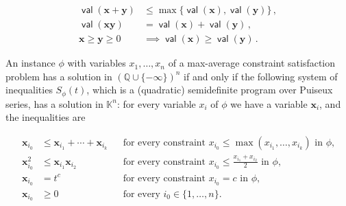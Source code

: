 \begin{equation}\tag{2}\label{S4.E2}
\begin{aligned}
\displaystyle\operatorname*{\mathsf{val}}(\bm{x}+\bm{y}) & \displaystyle\leq\max\{\operatorname*{\mathsf{val}}(\bm{x}),\operatorname*{\mathsf{val}}(\bm{y})\}\,, \\
\displaystyle\operatorname*{\mathsf{val}}(\bm{x}\bm{y}) & \displaystyle=\operatorname*{\mathsf{val}}(\bm{x})+\operatorname*{\mathsf{val}}(\bm{y})\,, \\
\displaystyle\bm{x}\geq\bm{y}\geq 0 & \displaystyle\implies\operatorname*{\mathsf{val}}(\bm{x})\geq\operatorname*{\mathsf{val}}(\bm{y})\,.
\end{aligned}
\end{equation}

\setcounter{theorem}{5}
\begin{theorem}\label{Thmtheorem6}
An instance $\phi$ with variables $x_{1},\dots,x_{n}$ of a max-average constraint satisfaction problem has a solution in $(\mathbb{Q}\cup\{-\infty\})^{n}$ if and only if the following system of inequalities $S_{\phi}(t)$, which is a (quadratic) semidefinite program over Puiseux series, has a solution in $\mathbb{K}^{n}$: for every variable $x_{i}$ of $\phi$ we have a variable $\bm{x}_{i}$, and the inequalities are


\begin{equation}\tag{3}\label{S4.E3}
\begin{aligned}
\displaystyle\bm{x}_{i_{0}} & \displaystyle\leq\bm{x}_{i_{1}}+\cdots+\bm{x}_{i_{k}} &  & \text{for every constraint }x_{i_{0}}\leq\max(x_{i_{1}},\dots,x_{i_{k}})\text{ in }\phi\text{,} \\
\displaystyle\bm{x}^{2}_{i_{0}} & \displaystyle\leq\bm{x}_{i_{1}}\bm{x}_{i_{2}} &  & \text{for every constraint }x_{i_{0}}\leq\frac{x_{i_{1}}+x_{i_{2}}}{2}\text{ in }\phi\text{,} \\
\displaystyle\bm{x}_{i_{0}} & \displaystyle=t^{c} &  & \text{for every constraint }x_{i_{0}}=c\text{ in }\phi\text{,} \\
\displaystyle\bm{x}_{i_{0}} & \displaystyle\geq 0 &  & \text{for every }i_{0}\in\{1,\dots,n\}\text{.}
\end{aligned}
\end{equation}
\end{theorem}

